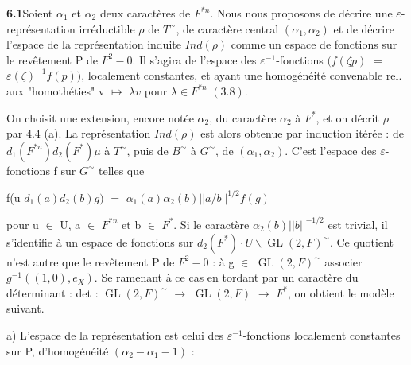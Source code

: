 \documentclass[10pt,a4paper]{article}
\begin{document}
\clearpage
{}
\label{d035-physical-028}
\par\medskip{}\par\smallskip
\par\noindent\textbf{6.1}\quad Soient $\alpha{}_1$ et $\alpha{}_2$ deux caractères de $F^{*n}$. Nous nous proposons de décrire une $\varepsilon{}$-représentation irréductible $\rho{}$ de $T^\sim$, de caractère central $(\alpha{}_1,\alpha{}_2)$ et de décrire l'espace de la représentation induite $Ind(\rho{})$ comme un espace de fonctions sur le revêtement P de $F^2-{0}$. Il s'agira de l'espace des $\varepsilon{}^{-1}$-fonctions $(f(\zeta{}p)$ $=$ $\varepsilon{}(\zeta{})^{-1}f(p))$, localement constantes, et ayant une homogénéité convenable rel. aux "homothéties" v $\mapsto{}$ $\lambda{}v$ pour $\lambda{}\in{}F^{*n}$ $(3.8)$.\par
\par On choisit une extension, encore notée $\alpha{}_2$, du caractère $\alpha{}_2$ à $F^*$, et on décrit $\rho{}$ par $4.4$ (a). La représentation $Ind(\rho{})$ est alors obtenue par induction itérée : de $d_1(F^{*n})d_2(F^*)\mu{}$ à $T^\sim$, puis de $B^\sim$ à $G^\sim$, de $(\alpha{}_1,\alpha{}_2)$. C'est l'espace des $\varepsilon{}$-fonctions f sur $G^\sim$ telles que\par
\par\smallskip\begin{center}\begin{minipage}{0.96\textwidth}\centering
f(u $d_1(a)d_2(b)g)$ $=$ $\alpha{}_1(a)\alpha{}_2(b)||a/b||^{1/2}f(g)$
\end{minipage}\end{center}\smallskip
\par pour u $\in{}$ U, a $\in{}$ $F^{*n}$ et b $\in{}$ $F^*$. Si le caractère $\alpha{}_2(b)||b||^{-1/2}$ est trivial, il s'identifie à un espace de fonctions sur $d_2(F^*)\cdot{}U\backslash \operatorname{GL}(2,F)^\sim$. Ce quotient n'est autre que le revêtement P de $F^2-{0}$ : à g $\in{}$ $\operatorname{GL}(2,F)^\sim$ associer $g^{-1}((1,0),e_X)$. Se ramenant à ce cas en tordant par un caractère du déterminant : det : $\operatorname{GL}(2,F)^\sim$ $\to{}$ $\operatorname{GL}(2,F)$ $\to{}$ $F^*$, on obtient le modèle suivant.\par
\par a) L'espace de la représentation est celui des $\varepsilon{}^{-1}$-fonctions localement constantes sur P, d'homogénéité $(\alpha{}_2-\alpha{}_1-1)$ :\par
\end{document}
